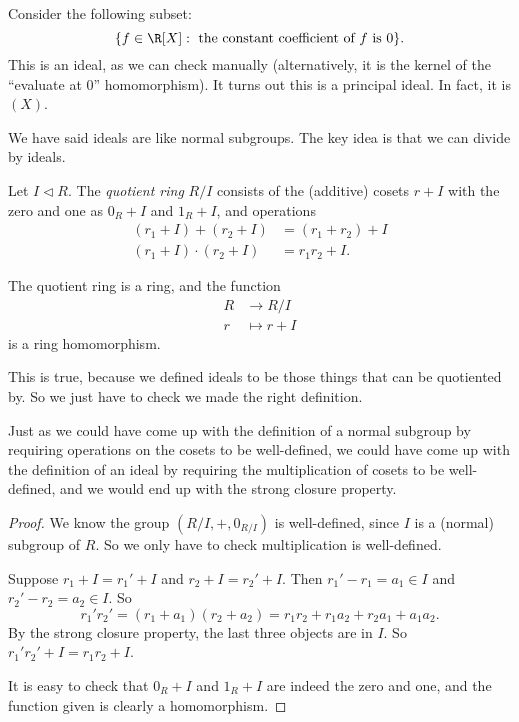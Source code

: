 \documentclass[a4paper]{article}
\begin{document}
\begin{eg}
  Consider the following subset:
  \[
    \{f \in \R[X]: \text{ the constant coefficient of }f \text{ is }0\}.
  \]
  This is an ideal, as we can check manually (alternatively, it is the kernel of the ``evaluate at $0$'' homomorphism). It turns out this is a principal ideal. In fact, it is $(X)$.
\end{eg}

We have said ideals are like normal subgroups. The key idea is that we can divide by ideals.

\begin{defi}
  Let $I \lhd R$. The \emph{quotient ring} $R/I$ consists of the (additive) cosets $r + I$ with the zero and one as $0_R + I$ and $1_R + I$, and operations
  \begin{align*}
    (r_1 + I) + (r_2 + I) &= (r_1 + r_2) + I\\
    (r_1 + I) \cdot (r_2 + I) &= r_1r_2 + I.
  \end{align*}
\end{defi}

\begin{prop}
  The quotient ring is a ring, and the function
  \begin{align*}
    R &\to R/I\\
    r &\mapsto r + I
  \end{align*}
  is a ring homomorphism.
\end{prop}
This is true, because we defined ideals to be those things that can be quotiented by. So we just have to check we made the right definition.

Just as we could have come up with the definition of a normal subgroup by requiring operations on the cosets to be well-defined, we could have come up with the definition of an ideal by requiring the multiplication of cosets to be well-defined, and we would end up with the strong closure property.

\begin{proof}
  We know the group $(R/I, +, 0_{R/I})$ is well-defined, since $I$ is a (normal) subgroup of $R$. So we only have to check multiplication is well-defined.

  Suppose $r_1 + I = r_1' + I$ and $r_2 + I = r_2' + I$. Then $r_1' - r_1 = a_1 \in I$ and $r_2' - r_2 = a_2 \in I$. So
  \[
    r_1' r_2' = (r_1 + a_1) (r_2 + a_2) = r_1 r_2 + r_1a_2 + r_2a_1 + a_1a_2.
  \]
  By the strong closure property, the last three objects are in $I$. So $r_1' r_2' + I = r_1r_2 + I$.

  It is easy to check that $0_R + I$ and $1_R + I$ are indeed the zero and one, and the function given is clearly a homomorphism.
\end{proof}
\end{document}

